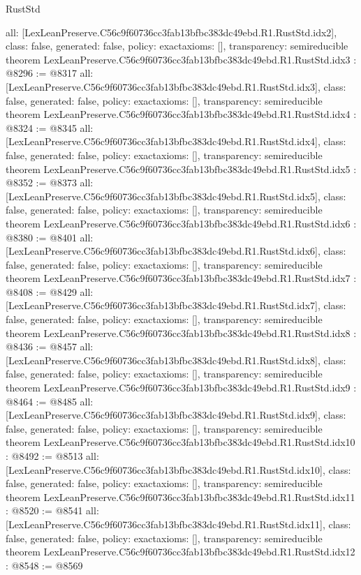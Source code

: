 \begin{lexlean}{RustStd}
\begin{coremodule}
{  all: [LexLeanPreserve.C56c9f60736cc3fab13bfbc383dc49ebd.R1.RustStd.idx2],
  class: false,
  generated: false,
  policy: exact{axioms: []},
  transparency: semireducible
}
theorem LexLeanPreserve.C56c9f60736cc3fab13bfbc383dc49ebd.R1.RustStd.idx3 : @8296 := @8317 {
  all: [LexLeanPreserve.C56c9f60736cc3fab13bfbc383dc49ebd.R1.RustStd.idx3],
  class: false,
  generated: false,
  policy: exact{axioms: []},
  transparency: semireducible
}
theorem LexLeanPreserve.C56c9f60736cc3fab13bfbc383dc49ebd.R1.RustStd.idx4 : @8324 := @8345 {
  all: [LexLeanPreserve.C56c9f60736cc3fab13bfbc383dc49ebd.R1.RustStd.idx4],
  class: false,
  generated: false,
  policy: exact{axioms: []},
  transparency: semireducible
}
theorem LexLeanPreserve.C56c9f60736cc3fab13bfbc383dc49ebd.R1.RustStd.idx5 : @8352 := @8373 {
  all: [LexLeanPreserve.C56c9f60736cc3fab13bfbc383dc49ebd.R1.RustStd.idx5],
  class: false,
  generated: false,
  policy: exact{axioms: []},
  transparency: semireducible
}
theorem LexLeanPreserve.C56c9f60736cc3fab13bfbc383dc49ebd.R1.RustStd.idx6 : @8380 := @8401 {
  all: [LexLeanPreserve.C56c9f60736cc3fab13bfbc383dc49ebd.R1.RustStd.idx6],
  class: false,
  generated: false,
  policy: exact{axioms: []},
  transparency: semireducible
}
theorem LexLeanPreserve.C56c9f60736cc3fab13bfbc383dc49ebd.R1.RustStd.idx7 : @8408 := @8429 {
  all: [LexLeanPreserve.C56c9f60736cc3fab13bfbc383dc49ebd.R1.RustStd.idx7],
  class: false,
  generated: false,
  policy: exact{axioms: []},
  transparency: semireducible
}
theorem LexLeanPreserve.C56c9f60736cc3fab13bfbc383dc49ebd.R1.RustStd.idx8 : @8436 := @8457 {
  all: [LexLeanPreserve.C56c9f60736cc3fab13bfbc383dc49ebd.R1.RustStd.idx8],
  class: false,
  generated: false,
  policy: exact{axioms: []},
  transparency: semireducible
}
theorem LexLeanPreserve.C56c9f60736cc3fab13bfbc383dc49ebd.R1.RustStd.idx9 : @8464 := @8485 {
  all: [LexLeanPreserve.C56c9f60736cc3fab13bfbc383dc49ebd.R1.RustStd.idx9],
  class: false,
  generated: false,
  policy: exact{axioms: []},
  transparency: semireducible
}
theorem LexLeanPreserve.C56c9f60736cc3fab13bfbc383dc49ebd.R1.RustStd.idx10 : @8492 := @8513 {
  all: [LexLeanPreserve.C56c9f60736cc3fab13bfbc383dc49ebd.R1.RustStd.idx10],
  class: false,
  generated: false,
  policy: exact{axioms: []},
  transparency: semireducible
}
theorem LexLeanPreserve.C56c9f60736cc3fab13bfbc383dc49ebd.R1.RustStd.idx11 : @8520 := @8541 {
  all: [LexLeanPreserve.C56c9f60736cc3fab13bfbc383dc49ebd.R1.RustStd.idx11],
  class: false,
  generated: false,
  policy: exact{axioms: []},
  transparency: semireducible
}
theorem LexLeanPreserve.C56c9f60736cc3fab13bfbc383dc49ebd.R1.RustStd.idx12 : @8548 := @8569 {
}
\end{coremodule}
\end{lexlean}
